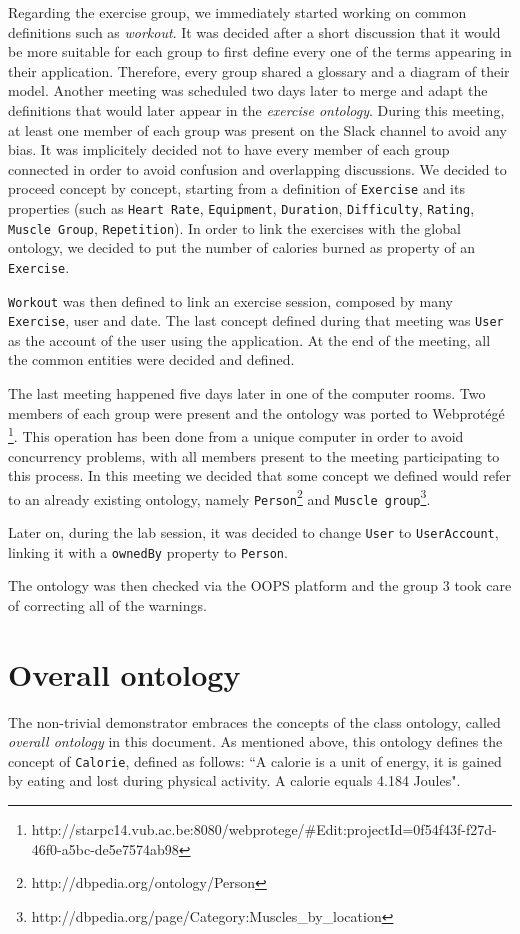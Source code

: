\documentclass[11pt,a4paper]{scrreprt}
\begin{document}
Regarding the exercise group, we immediately started working on common definitions such as \textit{workout}. It was decided after a short discussion that it would be more suitable for each group to first define every one of the terms appearing in their application.  Therefore, every group shared a glossary and a diagram of their model. Another meeting was scheduled two days later to merge and adapt the definitions that would later appear in the \textit{exercise ontology}. 
During this meeting, at least one member of each group was present on the Slack channel to avoid any bias. It was implicitely decided not to have every member of each group connected in order to avoid confusion and overlapping discussions. 
We decided to proceed concept by concept, starting from a definition of \texttt{Exercise} and its properties (such as \texttt{Heart Rate}, \texttt{Equipment}, \texttt{Duration}, \texttt{Difficulty}, \texttt{Rating}, \texttt{Muscle Group}, \texttt{Repetition}).
In order to link the exercises with the global ontology, we decided to put the number of calories burned as property of an \texttt{Exercise}.

\texttt{Workout} was then defined to link an exercise session, composed by many \texttt{Exercise}, user and date.
The last concept defined during that meeting was \texttt{User} as the account of the user using the application.
At the end of the meeting, all the common entities were decided and defined.

The last meeting happened five days later in one of the computer rooms. Two members of each group were present and the ontology was ported to Webprotégé \footnote{http://starpc14.vub.ac.be:8080/webprotege/\#Edit:projectId=0f54f43f-f27d-46f0-a5bc-de5e7574ab98}. 
This operation has been done from a unique computer in order to avoid concurrency problems, with all members present to the meeting participating to this process.
In this meeting we decided that some concept we defined would refer to an already existing ontology, namely \texttt{Person}\footnote{http://dbpedia.org/ontology/Person} and \texttt{Muscle group}\footnote{http://dbpedia.org/page/Category:Muscles\_by\_location}.

Later on, during the lab session, it was decided to change \texttt{User} to \texttt{UserAccount}, linking it with a \texttt{ownedBy} property to \texttt{Person}.

The ontology was then checked via the OOPS platform and the group 3 took care of correcting all of the warnings. 

\section{Overall ontology}
The non-trivial demonstrator embraces the concepts of the class ontology, called \textit{overall ontology} in this document.
As mentioned above, this ontology defines the concept of \texttt{Calorie}, defined as follows: ``A calorie is a unit of energy, it is gained by eating and lost during physical activity. A calorie equals 4.184 Joules".
\end{document}
